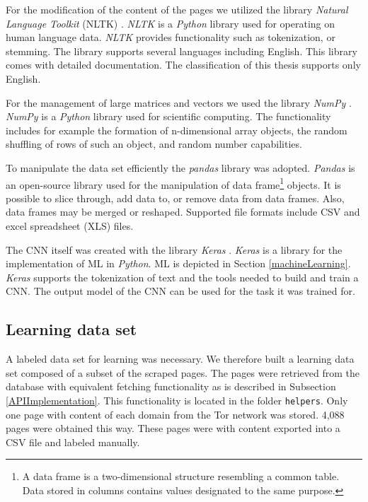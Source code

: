 For the modification of the content of the pages we utilized the library \textit{Natural Language Toolkit} (NLTK) \cite{nltk}. \textit{NLTK} is a \textit{Python} library used for operating on human language data. \textit{NLTK} provides functionality such as tokenization, or stemming. The library supports several languages including English. This library comes with detailed documentation. The classification of this thesis supports only English.

For the management of large matrices and vectors we used the library \textit{NumPy} \cite{numpy}. \textit{NumPy} is a \textit{Python} library used for scientific computing. The functionality includes for example the formation of n-dimensional array objects, the random shuffling of rows of such an object, and random number capabilities. 

To manipulate the data set efficiently the \textit{pandas} library \cite{pandas} was adopted. \textit{Pandas} is an open-source library used for the manipulation of data frame\footnote{A data frame is a two-dimensional structure resembling a common table. Data stored in columns contains values designated to the same purpose. } objects. It is possible to slice through, add data to, or remove data from data frames. Also, data frames may be merged or reshaped. Supported file formats include CSV and excel spreadsheet (XLS) files.

The CNN itself was created with the library \textit{Keras} \cite{keras}. \textit{Keras} is a library for the implementation of ML in \textit{Python}. ML is depicted in Section \ref{machineLearning}. \textit{Keras} supports the tokenization of text and the tools needed to build and train a CNN. The output model of the CNN can be used for the task it was trained for.

\subsection{Learning data set} \label{LearningDatasetImplementation}
A labeled data set for learning was necessary. We therefore built a learning data set composed of a subset of the scraped pages. The pages were retrieved from the database with equivalent fetching functionality as is described in Subsection \ref{APIImplementation}. This functionality is located in the folder \texttt{helpers}. Only one page with content of each domain from the Tor network was stored. 4,088 pages were obtained this way. These pages were with content exported into a CSV file and labeled manually. 

